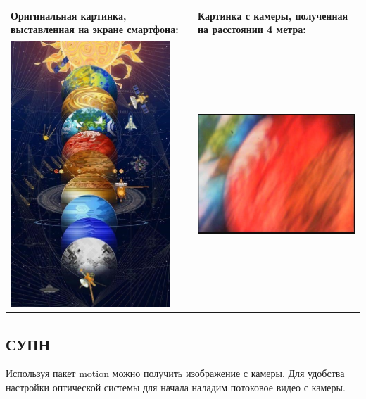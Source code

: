 \begin{table}[H]
    \center
    \begin{tabular}{|p{7.5cm}|p{7.5cm}|}
        \hline
        Оригинальная картинка, выставленная на экране смартфона:&
        Картинка с камеры, полученная на расстоянии 4 метра: \\
        \hline
        \hspace{0.5cm}\includegraphics[width=6cm]{5}
        & 
        \vspace{-8cm}
        \hspace{0.5cm}\includegraphics[width=7cm]{6} \\
        \hline
    \end{tabular}
\end{table}

\subsection*{СУПН}

Используя пакет motion можно получить изображение с камеры. Для удобства настройки оптической системы для начала наладим потоковое видео с камеры.

